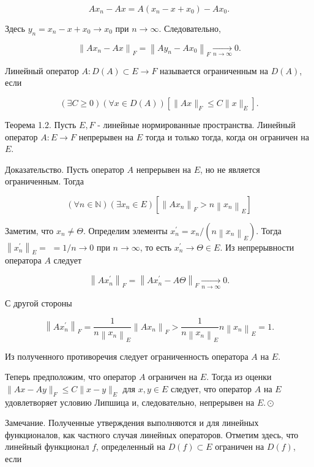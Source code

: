 $$
	A x_{n}-A x=A\left(x_{n}-x+x_{0}\right)-A x_{0} .
$$

Здесь $y_{n}=x_{n}-x+x_{0} \rightarrow x_{0}$ при $n \rightarrow \infty$. Следовательно,

$$
	\left\|A x_{n}-A x\right\|_{F}=\left\|A y_{n}-A x_{0}\right\|_{F} \underset{n \rightarrow \infty}{\longrightarrow} 0 .
$$

Линейный оператор $A: D(A) \subset E \rightarrow F$ называется ограниченным на $D(A)$, если

$$
	(\exists C \geq 0)(\forall x \in D(A))\left[\|A x\|_{F} \leq C\|x\|_{E}\right] .
$$

Теорема 1.2. Пусть $E, F$ - линейные нормированные пространства. Линейный оператор $A: E \rightarrow F$ непрерывен на $E$ тогда и только тогда, когда он ограничен на $E$.

Доказательство. Пусть оператор $A$ непрерывен на $E$, но не является ограниченным. Тогда

$$
	(\forall n \in \mathbb{N})\left(\exists x_{n} \in E\right)\left[\left\|A x_{n}\right\|_{F}>n\left\|x_{n}\right\|_{E}\right]
$$

Заметим, что $x_{n} \neq \Theta$. Определим элементы $x_{n}^{\prime}=x_{n} /\left(n\left\|x_{n}\right\|_{E}\right)$. Тогда $\left\|x_{n}^{\prime}\right\|_{E}=$ $=1 / n \rightarrow 0$ при $n \rightarrow \infty$, то есть $x_{n}^{\prime} \rightarrow \Theta \in E$. Из непрерывности оператора $A$ следует

$$
	\left\|A x_{n}^{\prime}\right\|_{F}=\left\|A x_{n}^{\prime}-A \Theta\right\|_{F} \underset{n \rightarrow \infty}{\longrightarrow} 0 .
$$

С другой стороны

$$
	\left\|A x_{n}^{\prime}\right\|_{F}=\frac{1}{n\left\|x_{n}\right\|_{E}}\left\|A x_{n}\right\|_{F}>\frac{1}{n\left\|x_{n}\right\|_{E}} n\left\|x_{n}\right\|_{E}=1 .
$$

Из полученного противоречия следует ограниченность оператора $A$ на $E$.

Теперь предположим, что оператор $A$ ограничен на $E$. Тогда из оценки $\|A x-A y\|_{F} \leq C\|x-y\|_{E}$ для $x, y \in E$ следует, что оператор $A$ на $E$ удовлетворяет условию Липшица и, следовательно, непрерывен на $E . \odot$

Замечание. Полученные утверждения выполняются и для линейных функционалов, как частного случая линейных операторов. Отметим здесь, что линейный функционал $f$, определенный на $D(f) \subset E$ ограничен на $D(f)$, если

